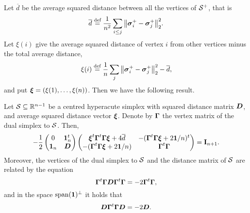 Let $\overline{d}$ be the average squared distance between all the vertices of $\mathcal{S}^+$, that is
\[\overline{d} \overset{\text{def}}{=}  \frac{1}{n^2}\sum_{i\leq j} \norm{\vb*{\sigma}_i^+-\vb*{\sigma}_j^+}_2^2.\]
Let $\xi(i)$ give the average squared distance of vertex $i$ from other vertices minus the total average distance, 
\[\xi(i) \overset{\text{def}}{=} \frac{1}{n}\sum_{j} \norm{\vb*{\sigma}_i^+-\vb*{\sigma}_j^+}_2^2 - \overline{d},\]
and put $\vb*{\xi}=(\xi(1),\dots,\xi(n))$. 
Then we have the following result. 

\begin{lemma}
	Let $\mathcal{S}\subseteq\mathbb{R}^{n-1}$ be a centred hyperacute simplex with  squared distance matrix $\vb*{D}$, and average squared distance vector $\vb*{\xi}$. Denote by $\vb*{\Gamma}$ the vertex matrix of the dual simplex to $\mathcal{S}$. Then, 
	\begin{equation}
	\label{eq:simplex_block_matrix}
	-\frac{1}{2} \begin{pmatrix}
	0 & \vb{1}_n^t \\ 
	\vb{1}_n &  \vb*{D}
	\end{pmatrix}\begin{pmatrix}
	\vb*{\xi}^t \vb*{\Gamma}^t \vb*{\Gamma}\vb*{\xi} + 4\overline{d} & -(\vb*{\Gamma}^t \vb*{\Gamma}\vb*{\xi} + 2\vb{1}/n)^t \\
	-(\vb*{\Gamma}^t \vb*{\Gamma}\vb*{\xi} + 2\vb{1}/n) & \vb*{\Gamma}^t \vb*{\Gamma}
	\end{pmatrix} = \vb{I}_{n+1}.
	\end{equation}
	Moreover, the vertices of the dual simplex to $\mathcal{S}$ and the distance matrix of $\mathcal{S}$ are related by the equation
	\begin{equation}
	\label{eq:lem_inverse_relation}
	\vb*{\Gamma}^t \vb*{\Gamma} \vb*{D} \vb*{\Gamma}^t \vb*{\Gamma} = -2\vb*{\Gamma}^t \vb*{\Gamma},
	\end{equation}
	and in the space $\textnormal{span}(\vb{1})^\perp$ it holds that 
	\begin{equation*}
	\label{eq:lem_inverse_relation2}
	\vb*{D}\vb*{\Gamma}^t \vb*{\Gamma} \vb*{D}= -2\vb*{D}.	
	\end{equation*}
\end{lemma}

